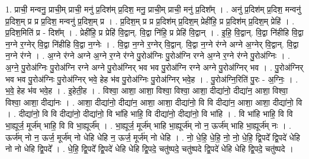 \documentclass[17pt]{extarticle}
\begin{document}
1. प्राची॒ मन्वनु॒ प्राची॒म् प्राची॒ मनु॑ प्र॒दिश॑म् प्र॒दिश॒ मनु॒ प्राची॒म् प्राची॒ मनु॑ प्र॒दिश᳚म् । . अनु॑ प्र॒दिश॑म् प्र॒दिश॒ मन्वनु॑ प्र॒दिश॒म् प्र प्र प्र॒दिश॒ मन्वनु॑ प्र॒दिश॒म् प्र । . प्र॒दिश॒म् प्र प्र प्र॒दिश॑म् प्र॒दिश॒म् प्रेही॑हि॒ प्र प्र॒दिश॑म् प्र॒दिश॒म् प्रेहि॑ । . प्र॒दिश॒मिति॑ प्र - दिश᳚म् । . प्रेही॑हि॒ प्र प्रेहि॑ वि॒द्वान्. वि॒द्वा नि॑हि॒ प्र प्रेहि॑ वि॒द्वान् । . इ॒हि॒ वि॒द्वान्. वि॒द्वा नि॑हीहि वि॒द्वा न॒ग्ने र॒ग्नेर् वि॒द्वा नि॑हीहि वि॒द्वा न॒ग्नेः । . वि॒द्वा न॒ग्ने र॒ग्नेर् वि॒द्वान्. वि॒द्वा न॒ग्ने र॑ग्ने अग्ने अ॒ग्नेर् वि॒द्वान्. वि॒द्वा न॒ग्ने र॑ग्ने । . अ॒ग्ने र॑ग्ने अग्ने अ॒ग्ने र॒ग्ने र॑ग्ने पु॒रोअ॑ग्निः पु॒रोअ॑ग्नि रग्ने अ॒ग्ने र॒ग्ने र॑ग्ने पु॒रोअ॑ग्निः । . अ॒ग्ने॒ पु॒रोअ॑ग्निः पु॒रोअ॑ग्नि रग्ने अग्ने पु॒रोअ॑ग्निर् भव भव पु॒रोअ॑ग्नि रग्ने अग्ने पु॒रोअ॑ग्निर् भव । . पु॒रोअ॑ग्निर् भव भव पु॒रोअ॑ग्निः पु॒रोअ॑ग्निर् भवे॒ हेह भ॑व पु॒रोअ॑ग्निः पु॒रोअ॑ग्निर् भवे॒ह । . पु॒रोअ॑ग्नि॒रिति॑ पु॒रः - अ॒ग्निः॒ । . भ॒वे॒ हेह भ॑व भवे॒ह । . इ॒हेती॒ह । . विश्वा॒ आशा॒ आशा॒ विश्वा॒ विश्वा॒ आशा॒ दीद्या॑नो॒ दीद्या॑न॒ आशा॒ विश्वा॒ विश्वा॒ आशा॒ दीद्या॑नः । . आशा॒ दीद्या॑नो॒ दीद्या॑न॒ आशा॒ आशा॒ दीद्या॑नो॒ वि वि दीद्या॑न॒ आशा॒ आशा॒ दीद्या॑नो॒ वि । . दीद्या॑नो॒ वि वि दीद्या॑नो॒ दीद्या॑नो॒ वि भा॑हि भाहि॒ वि दीद्या॑नो॒ दीद्या॑नो॒ वि भा॑हि । . वि भा॑हि भाहि॒ वि वि भा॒ह्यूर्ज॒ मूर्ज॑म् भाहि॒ वि वि भा॒ह्यूर्ज᳚म् । . भा॒ह्यूर्ज॒ मूर्ज॑म् भाहि भा॒ह्यूर्ज॑म् नो न॒ ऊर्ज॑म् भाहि भा॒ह्यूर्ज॑म् नः । . ऊर्ज॑म् नो न॒ ऊर्ज॒ मूर्ज॑म् नो धेहि धेहि न॒ ऊर्ज॒ मूर्ज॑म् नो धेहि । . नो॒ धे॒हि॒ धे॒हि॒ नो॒ नो॒ धे॒हि॒ द्वि॒पदे᳚ द्वि॒पदे॑ धेहि नो नो धेहि द्वि॒पदे᳚ । . धे॒हि॒ द्वि॒पदे᳚ द्वि॒पदे॑ धेहि धेहि द्वि॒पदे॒ चतु॑ष्पदे॒ चतु॑ष्पदे द्वि॒पदे॑ धेहि धेहि द्वि॒पदे॒ चतु॑ष्पदे । \newline
\end{document}

